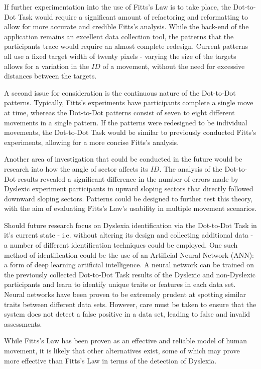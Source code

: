 		If further experimentation into the use of Fitts’s Law is to take place, the Dot-to-Dot Task would require a significant amount of refactoring and reformatting to allow for more accurate and credible Fitts’s analysis. While the back-end of the application remains an excellent data collection tool, the patterns that the participants trace would require an almost complete redesign. Current patterns all use a fixed target width of twenty pixels - varying the size of the targets allows for a variation in the \(ID\) of a movement, without the need for excessive distances between the targets. 
		
		A second issue for consideration is the continuous nature of the Dot-to-Dot patterns. Typically, Fitts’s experiments have participants complete a single move at time, whereas the Dot-to-Dot patterns consist of seven to eight different movements in a single pattern. If the patterns were redesigned to be individual movements, the Dot-to-Dot Task would be similar to previously conducted Fitts’s experiments, allowing for a more concise Fitts’s analysis.
		
		Another area of investigation that could be conducted in the future would be research into how the angle of sector affects its \(ID\). The analysis of the Dot-to-Dot results revealed a significant difference in the number of  errors made by Dyslexic experiment participants in upward sloping sectors that directly followed downward sloping sectors. Patterns could be designed to further test this theory, with the aim of evaluating Fitts’s Law’s usability in multiple movement scenarios.
		
		Should future research focus on Dyslexia identification via the Dot-to-Dot Task in it’s current state - i.e. without altering its design and collecting additional data - a number of different identification techniques could be employed. One such method of identification could be the use of an Artificial Neural Network (ANN): a form of  deep learning artificial intelligence. A neural network can be trained on the previously collected Dot-to-Dot Task results of the Dyslexic and non-Dyslexic participants and learn to identify unique traits or features in each data set. Neural networks have been proven to be extremely prudent at spotting similar traits between different data sets. However, care must be taken to ensure that the system does not detect a false positive in a data set, leading to false and invalid assessments.
		
		While Fitts’s Law has been proven as an effective and reliable model of human movement, it is likely that other alternatives exist, some of which may prove more effective than Fitts’s Law in terms of the detection of Dyslexia.
		
		
		
\newpage